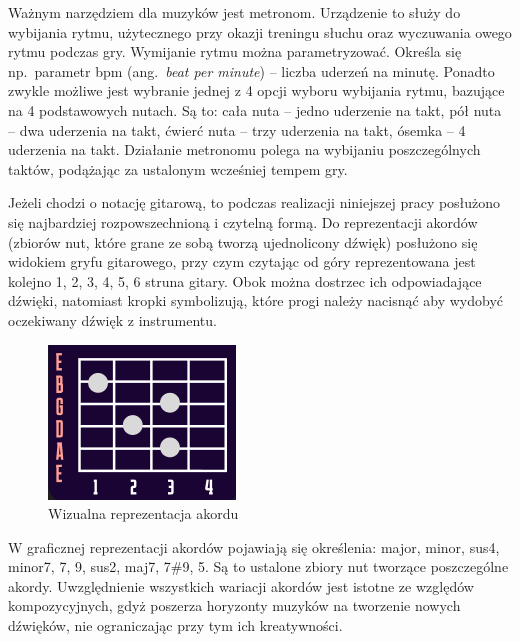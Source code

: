 Ważnym narzędziem dla muzyków jest metronom. Urządzenie to służy do wybijania rytmu, użytecznego przy okazji treningu słuchu oraz wyczuwania owego rytmu podczas gry. 
Wymijanie rytmu można parametryzować. Określa się np.\ parametr bpm (ang.~\emph{beat per minute}) -- liczba uderzeń na minutę. Ponadto zwykle możliwe jest wybranie jednej z 4 opcji wyboru wybijania rytmu, bazujące na 4 podstawowych nutach. Są to: cała nuta -- jedno uderzenie na takt, pół nuta -- dwa uderzenia na takt, ćwierć nuta -- trzy uderzenia na takt, ósemka -- 4 uderzenia na takt. Działanie metronomu polega na wybijaniu poszczególnych taktów, podążając za ustalonym wcześniej tempem gry. 

Jeżeli chodzi o notację gitarową, to podczas realizacji niniejszej pracy posłużono się najbardziej rozpowszechnioną i czytelną formą. Do reprezentacji akordów (zbiorów nut, które grane ze sobą tworzą ujednolicony dźwięk) posłużono się widokiem gryfu gitarowego, przy czym czytając od góry reprezentowana jest kolejno 1, 2, 3, 4, 5, 6 struna gitary. Obok można dostrzec ich odpowiadające dźwięki, natomiast kropki symbolizują, które progi należy nacisnąć aby wydobyć oczekiwany dźwięk z instrumentu.


\begin{figure}[htb]
	\centering
	\includegraphics[width=.4\linewidth]{rys02/akord2.2}
	\caption{Wizualna reprezentacja akordu} \label{fig:pageLayout}
\end{figure}

W graficznej reprezentacji akordów pojawiają się określenia: major, minor, sus4, minor7, 7, 9, sus2, maj7, 7\#9, 5. Są to ustalone zbiory nut tworzące poszczególne akordy. Uwzględnienie wszystkich wariacji akordów jest istotne ze względów kompozycyjnych, gdyż poszerza horyzonty muzyków na tworzenie nowych dźwięków, nie ograniczając przy tym ich kreatywności. 

